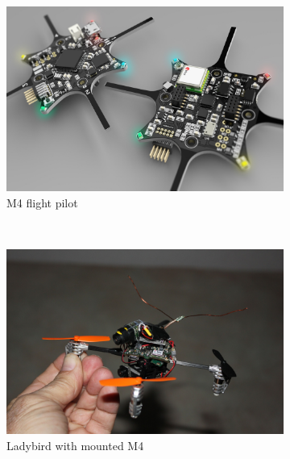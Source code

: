 \begin{figure}[H]
    \centering
    \begin{subfigure}[b]{0.3\textwidth}
        \includegraphics[width=\textwidth]{graphics/M4_demo}
        \caption{M4 flight pilot}
        \label{fig:gull}
    \end{subfigure}
    ~ %
    \begin{subfigure}[b]{0.3\textwidth}
        \includegraphics[width=\textwidth]{graphics/ladybird}
        \caption{Ladybird with mounted M4}
        \label{fig:tiger}
    \end{subfigure}
    ~ %
    \begin{subfigure}[b]{0.3\textwidth}

\end{subfigure}
\end{figure}
